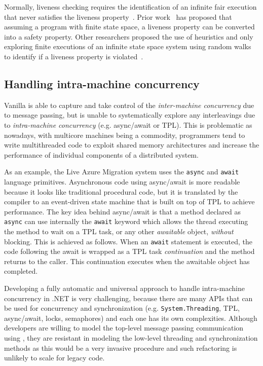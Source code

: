 Normally, liveness checking requires the identification of an infinite fair execution that never satisfies the liveness property~\cite{schuppan2004efficient, musuvathi2008fair}. Prior work~\cite{schuppan2004efficient} has proposed that assuming a program with finite state space, a liveness property can be converted into a safety property. Other researchers proposed the use of heuristics and only exploring finite executions of an infinite state space system using random walks to identify if a liveness property is violated~\cite{killian2007life}.

\subsection{Handling intra-machine concurrency}
\label{sec:psharp:async}

Vanilla \psharp is able to capture and take control of the \emph{inter-machine concurrency} due to message passing, but is unable to systematically explore any interleavings due to \emph{intra-machine concurrency} (e.g. async/await or TPL). This is problematic as nowadays, with multicore machines being a commodity, programmers tend to write multithreaded code to exploit shared memory architectures and increase the performance of individual components of a distributed system.

As an example, the Live Azure Migration system uses the \texttt{async} and \texttt{await}  language primitives. Asynchronous code using async/await is more readable because it looks like traditional procedural code, but it is translated by the compiler to an event-driven state machine that is built on top of TPL to achieve performance. The key idea behind async/await is that a method declared as \texttt{async} can use internally the \texttt{await} keyword which allows the thread executing the method to wait on a TPL task, or any other \emph{awaitable} object, \emph{without} blocking. This is achieved as follows. When an \texttt{await} statement is executed, the code following the await is wrapped as a TPL task \emph{continuation} and the method returns to the caller. This continuation executes when the awaitable object has completed.

Developing a fully automatic and universal approach to handle intra-machine concurrency in .NET is very challenging, because there are many APIs that can be used for concurrency and synchronization (e.g. \texttt{System.Threading}, TPL, async/await, locks, semaphores) and each one has its own complexities. Although developers are willing to model the top-level message passing communication using \psharp, they are resistant in modeling the low-level threading and synchronization methods as this would be a very invasive procedure and such refactoring is unlikely to scale for legacy code.

